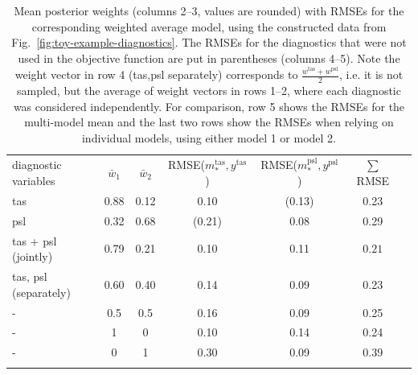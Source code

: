 \begin{table}[]
        \begin{tabular}{lcccccc}
        \tophline
         diagnostic variables & $\bar{w}_1$ & $\bar{w}_2$ & RMSE($m^{\textrm{tas}}_*, y^{\textrm{tas}}$) & RMSE($m^{\textrm{psl}}_*, y^{\textrm{psl}}$) & $\sum$ RMSE\\ \middlehline
        tas  & 0.88 & 0.12 & 0.10 & (0.13) & 0.23\\
        psl  &  0.32 & 0.68 & (0.21) & 0.08 & 0.29 \\ \middlehline
        tas + psl (jointly)  & 0.79 & 0.21 & 0.10 & 0.11 & $\mathbf{0.21}$\\
        tas, psl (separately)  & 0.60  & 0.40 & 0.14 & 0.09 & 0.23 \\ \middlehline
        -  &  0.5  & 0.5 & 0.16 & 0.09 & 0.25 \\
        -  &  1  & 0 & 0.10 & 0.14 & 0.24 \\
        -  &  0  & 1 & 0.30 & 0.09 & 0.39 \\ \bottomhline
    \end{tabular}
    \belowtable{} 
    \caption{Mean posterior weights (columns 2--3, values are rounded) with RMSEs for the corresponding weighted average model, using the constructed data from Fig.~\ref{fig:toy-example-diagnostics}. The RMSEs for the diagnostics that were not used in the objective function are put in parentheses (columns 4--5). Note the weight vector in row 4 (tas,psl separately) corresponds to $\frac{w^{\textrm{tas}} + w^{\textrm{psl}}}{2}$, i.e. it is not sampled, but the average of weight vectors in rows 1--2, where each diagnostic was considered independently. For comparison, row 5 shows the RMSEs for the multi-model mean and the last two rows show the RMSEs when relying on individual models, using either model 1 or model 2.}
    \label{tab:toy-example-diagnostics-rmses}
\end{table}

